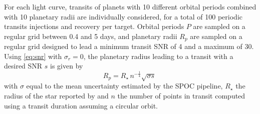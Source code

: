 \documentclass[modern]{aastex631}
\begin{document}
For each light curve, transits of planets with 10 different orbital periods combined with 10 planetary radii are individually considered, for a total of 100 periodic transits injections and recovery per target. Orbital periods $P$ are sampled on a regular grid between 0.4 and 5 days, and planetary radii $R_p$ are sampled on a regular grid designed to lead a minimum transit SNR of 4 and a maximum of 30. Using \autoref{eq:snr} with $\sigma_r = 0$, the planetary radius leading to a transit with a desired SNR $s$ is given by
\begin{equation*}
    R_p = R_{\star}\,n^{-\frac{1}{4}} \sqrt{\sigma s}\ %
\end{equation*}
with $\sigma$ equal to the mean uncertainty estimated by the SPOC pipeline, $R_\star$ the radius of the star reported by \cite{Ramsay2020} and $n$ the number of points in transit computed using a transit duration assuming a circular orbit.
\end{document}
